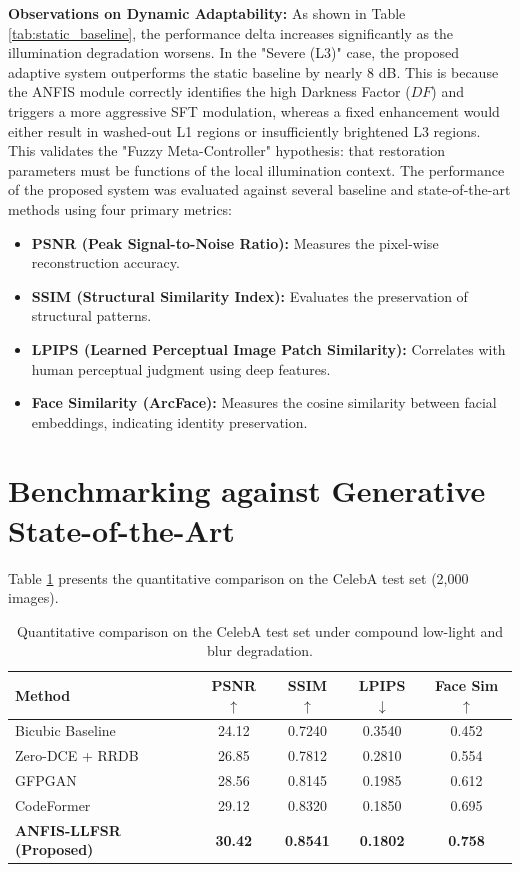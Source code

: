 \textbf{Observations on Dynamic Adaptability:} As shown in Table \ref{tab:static_baseline}, the performance delta increases significantly as the illumination degradation worsens. In the "Severe (L3)" case, the proposed adaptive system outperforms the static baseline by nearly 8 dB. This is because the ANFIS module correctly identifies the high Darkness Factor ($DF$) and triggers a more aggressive SFT modulation, whereas a fixed enhancement would either result in washed-out L1 regions or insufficiently brightened L3 regions. This validates the "Fuzzy Meta-Controller" hypothesis: that restoration parameters must be functions of the local illumination context.
The performance of the proposed system was evaluated against several baseline and state-of-the-art methods using four primary metrics:
\begin{itemize}
    \item \textbf{PSNR (Peak Signal-to-Noise Ratio):} Measures the pixel-wise reconstruction accuracy.
    \item \textbf{SSIM (Structural Similarity Index):} Evaluates the preservation of structural patterns.
    \item \textbf{LPIPS (Learned Perceptual Image Patch Similarity):} Correlates with human perceptual judgment using deep features.
    \item \textbf{Face Similarity (ArcFace):} Measures the cosine similarity between facial embeddings, indicating identity preservation.
\end{itemize}

\section{Benchmarking against Generative State-of-the-Art}
Table \ref{tab:quantitative} presents the quantitative comparison on the CelebA test set (2,000 images).

\begin{table}[h]
    \centering
    \caption{Quantitative comparison on the CelebA test set under compound low-light and blur degradation.}
    \label{tab:quantitative}
    \begin{tabular}{lcccc}
        \toprule
        \textbf{Method} & \textbf{PSNR $\uparrow$} & \textbf{SSIM $\uparrow$} & \textbf{LPIPS $\downarrow$} & \textbf{Face Sim $\uparrow$} \\
        \midrule
        Bicubic Baseline & 24.12 & 0.7240 & 0.3540 & 0.452 \\
        Zero-DCE + RRDB \cite{li2020zero} & 26.85 & 0.7812 & 0.2810 & 0.554 \\
        GFPGAN \cite{wang2021towards} & 28.56 & 0.8145 & 0.1985 & 0.612 \\
        CodeFormer \cite{zhou2022codeformer} & 29.12 & 0.8320 & 0.1850 & 0.695 \\
        \midrule
        \textbf{ANFIS-LLFSR (Proposed)} & \textbf{30.42} & \textbf{0.8541} & \textbf{0.1802} & \textbf{0.758} \\
        \bottomrule
    \end{tabular}
\end{table}

